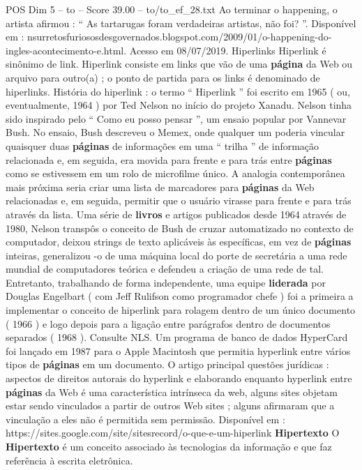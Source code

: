 \begin{textsample}{POS Dim 5 – to – Score 39.00 – to/to\_ef\_28.txt}
Ao terminar o happening, o artista afirmou : “ As tartarugas foram verdadeiras artistas, não foi? ”.
Disponível em : nsurretosfuriososdesgovernados.blogspot.com/2009/01/o-happening-do-ingles-acontecimento-e.html.
Acesso em 08/07/2019.
Hiperlinks Hiperlink é sinônimo de link.
Hiperlink consiste em links que vão de uma \textbf{página} da Web ou arquivo para outro(a) ; o ponto de partida para os links é denominado de hiperlinks.
História do hiperlink : o termo “ Hiperlink ” foi escrito em 1965 ( ou, eventualmente, 1964 ) por Ted Nelson no início do projeto Xanadu.
Nelson tinha sido inspirado pelo “ Como eu posso pensar ”, um ensaio popular por Vannevar Bush.
No ensaio, Bush descreveu o Memex, onde qualquer um poderia vincular quaisquer duas \textbf{páginas} de informações em uma “ trilha ” de informação relacionada e, em seguida, era movida para frente e para trás entre \textbf{páginas} como se estivessem em um rolo de microfilme único.
A analogia contemporânea mais próxima seria criar uma lista de marcadores para \textbf{páginas} da Web relacionadas e, em seguida, permitir que o usuário virasse para frente e para trás através da lista.
Uma série de \textbf{livros} e artigos publicados desde 1964 através de 1980, Nelson transpôs o conceito de Bush de cruzar automatizado no contexto de computador, deixou strings de texto aplicáveis às específicas, em vez de \textbf{páginas} inteiras, generalizou -o de uma máquina local do porte de secretária a uma rede mundial de computadores teórica e defendeu a criação de uma rede de tal.
Entretanto, trabalhando de forma independente, uma equipe \textbf{liderada} por Douglas Engelbart ( com Jeff Rulifson como programador chefe ) foi a primeira a implementar o conceito de hiperlink para rolagem dentro de um único documento ( 1966 ) e logo depois para a ligação entre parágrafos dentro de documentos separados ( 1968 ).
Consulte NLS.
Um programa de banco de dados HyperCard foi lançado em 1987 para o Apple Macintosh que permitia hyperlink entre vários tipos de \textbf{páginas} em um documento.
O artigo principal questões jurídicas : aspectos de direitos autorais do hyperlink e elaborando enquanto hyperlink entre \textbf{páginas} da Web é uma característica intrínseca da web, alguns sites objetam estar sendo vinculados a partir de outros Web sites ; alguns afirmaram que a vinculação a eles não é permitida sem permissão.
Disponível em : https://sites.google.com/site/sitesrecord/o-que-e-um-hiperlink \textbf{Hipertexto} O \textbf{Hipertexto} é um conceito associado às tecnologias da informação e que faz referência à escrita eletrônica.

\end{textsample}
